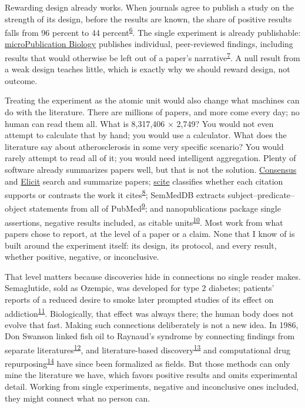 \documentclass[12pt]{article}
\begin{document}
Rewarding design already works. When journals agree to publish a study on the strength of its design, before the results are known, the share of positive results falls from 96 percent to 44 percent\textsuperscript{\hyperlink{ref-scheel2021}{6}}. The single experiment is already publishable: \href{https://www.micropublication.org/}{microPublication Biology} publishes individual, peer-reviewed findings, including results that would otherwise be left out of a paper's narrative\textsuperscript{\hyperlink{ref-raciti2018}{7}}. A null result from a weak design teaches little, which is exactly why we should reward design, not outcome.

Treating the experiment as the atomic unit would also change what machines can do with the literature. There are millions of papers, and more come every day; no human can read them all. What is 8,317,406 × 2,749? You would not even attempt to calculate that by hand; you would use a calculator. What does the literature say about atherosclerosis in some very specific scenario? You would rarely attempt to read all of it; you would need intelligent aggregation. Plenty of software already summarizes papers well, but that is not the solution. \href{https://consensus.app/}{Consensus} and \href{https://elicit.com/}{Elicit} search and summarize papers; \href{https://scite.ai/}{scite} classifies whether each citation supports or contrasts the work it cites\textsuperscript{\hyperlink{ref-nicholson2021}{8}}; SemMedDB extracts subject--predicate--object statements from all of PubMed\textsuperscript{\hyperlink{ref-kilicoglu2012}{9}}; and nanopublications package single assertions, negative results included, as citable units\textsuperscript{\hyperlink{ref-schultes2022}{10}}. Most work from what papers chose to report, at the level of a paper or a claim. None that I know of is built around the experiment itself: its design, its protocol, and every result, whether positive, negative, or inconclusive.

That level matters because discoveries hide in connections no single reader makes. Semaglutide, sold as Ozempic, was developed for type 2 diabetes; patients' reports of a reduced desire to smoke later prompted studies of its effect on addiction\textsuperscript{\hyperlink{ref-wang2024}{11}}. Biologically, that effect was always there; the human body does not evolve that fast. Making such connections deliberately is not a new idea. In 1986, Don Swanson linked fish oil to Raynaud's syndrome by connecting findings from separate literatures\textsuperscript{\hyperlink{ref-swanson1986}{12}}, and literature-based discovery\textsuperscript{\hyperlink{ref-henry2017}{13}} and computational drug repurposing\textsuperscript{\hyperlink{ref-pushpakom2019}{14}} have since been formalized as fields. But those methods can only mine the literature we have, which favors positive results and omits experimental detail. Working from single experiments, negative and inconclusive ones included, they might connect what no person can.
\end{document}

